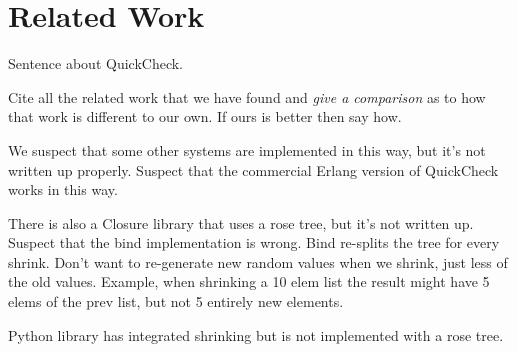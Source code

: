 \clearpage
\section{Related Work}

Sentence about QuickCheck\cite{claessen:quickcheck}. 

Cite all the related work that we have found and \emph{give a comparison} as to how that work is different to our own. If ours is better then say how.

We suspect that some other systems are implemented in this way, but it's not written up properly. Suspect that the commercial Erlang version of QuickCheck works in this way. 

There is also a Closure library that uses a rose tree, but it's not written up. Suspect that the bind implementation is wrong. Bind re-splits the tree for every shrink. Don't want to re-generate new random values when we shrink, just less of the old values. Example, when shrinking a 10 elem list the result might have 5 elems of the prev list, but not 5 entirely new elements. 

Python library has integrated shrinking but is not implemented with a rose tree.

